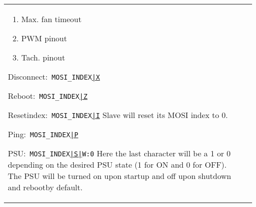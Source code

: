 \documentclass{article}
\begin{document}
\begin{center}
\begin{longtable}{| p{} | p{} |}
\begin{itemize}
{\begin{enumerate}
			\item Max. fan timeout
			\item PWM pinout
			\item Tach. pinout
			\end{enumerate}
		\item {Disconnect:}\
		\linebreak\texttt{MOSI\_INDEX\underline{|X}}
		\item {Reboot:}\
		\linebreak\texttt{MOSI\_INDEX\underline{|Z}}
		\item {Reset\hspace{.5em}index:}\
		\linebreak\texttt{MOSI\_INDEX\underline{|I}}
		\linebreak Slave will reset its MOSI index to 0.
		\item {Ping:}\
		\linebreak\texttt{MOSI\_INDEX\underline{|P}}
		\item {PSU:}\
		\linebreak\texttt{MOSI\_INDEX\underline{|S|}W:0}
		\linebreak Here the last character will be a 1 or 0 depending on the desired PSU			state (1 for ON and 0 for OFF). The PSU will be turned on upon startup and off
			upon shutdown and rebootby default.
		
}
\end{itemize}
\end{longtable}
\end{center}
\end{document}
